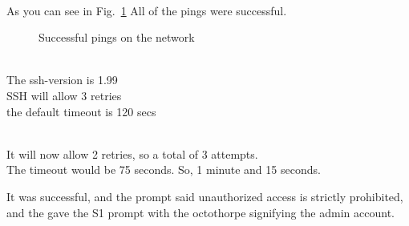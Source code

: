 \documentclass[../EngineeringJournal_CDavis.tex]{subfiles}
\begin{document}
\noindent{}
\\As you can see in Fig.~\ref{Ping10} All of the pings were successful.



\begin{figure}[!hbt]\centering
{}\hfill
{}\par 
{}
\caption{Successful pings on the network}
\label{Ping10}
\end{figure}

\clearpage

\noindent{}
\\The ssh-version is 1.99
\\SSH will allow 3 retries
\\the default timeout is 120 secs


\noindent{}
\\It will now allow 2 retries, so a total of 3 attempts.
\\The timeout would be 75 seconds. So, 1 minute and 15 seconds.


It was successful, and the prompt said unauthorized access is strictly
prohibited, and the gave the S1 prompt with the octothorpe signifying the admin
account.
\end{document}
